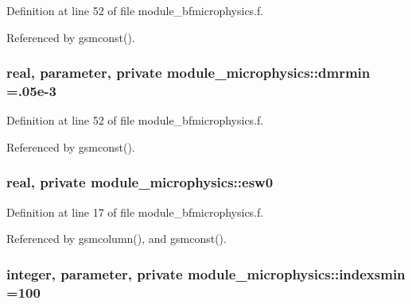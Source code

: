 Definition at line 52 of file module\+\_\+bfmicrophysics.\+f.



Referenced by gsmconst().

\subsubsection[{\texorpdfstring{dmrmin}{dmrmin}}]{\setlength{\rightskip}{0pt plus 5cm}real, parameter, private module\+\_\+microphysics\+::dmrmin =.\+05e-\/3\hspace{0.3cm}{\ttfamily [private]}}\hypertarget{namespacemodule__microphysics_a67a841cda9f172633fa4895d1a3433e7}{}\label{namespacemodule__microphysics_a67a841cda9f172633fa4895d1a3433e7}


Definition at line 52 of file module\+\_\+bfmicrophysics.\+f.



Referenced by gsmconst().

\subsubsection[{\texorpdfstring{esw0}{esw0}}]{\setlength{\rightskip}{0pt plus 5cm}real, private module\+\_\+microphysics\+::esw0\hspace{0.3cm}{\ttfamily [private]}}\hypertarget{namespacemodule__microphysics_a74a1e9686afb4c7b7b7913cf9615ee0c}{}\label{namespacemodule__microphysics_a74a1e9686afb4c7b7b7913cf9615ee0c}


Definition at line 17 of file module\+\_\+bfmicrophysics.\+f.



Referenced by gsmcolumn(), and gsmconst().

\subsubsection[{\texorpdfstring{indexsmin}{indexsmin}}]{\setlength{\rightskip}{0pt plus 5cm}integer, parameter, private module\+\_\+microphysics\+::indexsmin =100\hspace{0.3cm}{\ttfamily [private]}}\hypertarget{namespacemodule__microphysics_a48966fa99ac5a7268ef5f473a675eeb2}{}\label{namespacemodule__microphysics_a48966fa99ac5a7268ef5f473a675eeb2}


